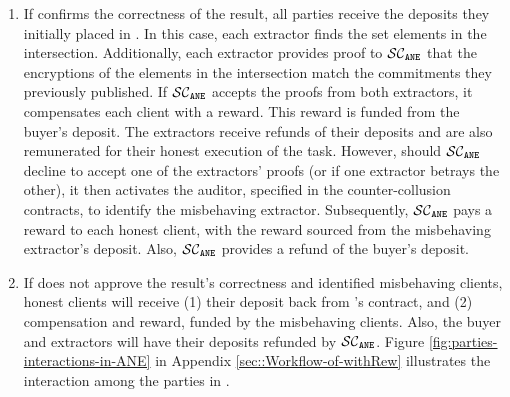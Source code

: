 \vspace{-2mm}
\begin{enumerate}[leftmargin=4.5mm]
\item If  \scf confirms the correctness of the result,  all parties receive the deposits they initially placed in \scf. In this case, each extractor finds the set elements in the intersection. Additionally, each extractor provides proof to $\mathcal{SC}_{\mathtt{ANE}}$ that the encryptions of the elements in the intersection match the commitments they previously published. If $\mathcal{SC}_{\mathtt{ANE}}$ accepts the proofs from both extractors, it compensates each client  with a reward. This reward is funded from the buyer's deposit. The extractors receive refunds of their deposits and are also remunerated for their honest execution of the task. 
%
However, should  $\mathcal{SC}_{\mathtt{ANE}}$ decline to accept one of the extractors' proofs (or if one extractor betrays the other), it then activates the auditor, specified in the counter-collusion contracts, to identify the misbehaving extractor. Subsequently, $\mathcal{SC}_{\mathtt{ANE}}$ pays a reward to each honest client, with the reward sourced from the misbehaving extractor's deposit. Also, $\mathcal{SC}_{\mathtt{ANE}}$ provides a refund of the buyer's deposit. 

\item If \scf does not approve the result's correctness and \aud identified misbehaving clients, honest clients will receive (1) their deposit back from \fpsi's contract, and (2)  compensation and reward, funded by the misbehaving clients. Also, the buyer and extractors will have their deposits refunded by $\mathcal{SC}_{\mathtt{ANE}}$. Figure \ref{fig:parties-interactions-in-ANE} in Appendix \ref{sec::Workflow-of-withRew}  illustrates the interaction among the parties in \withRew. 
\end{enumerate}














